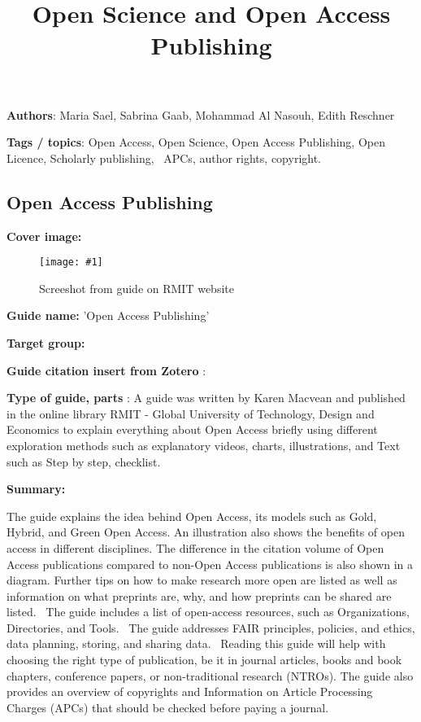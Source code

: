 \documentclass{article}
\newlength{\imgwidth}
\newcommand\scaledgraphics[2]{%
                
\settowidth{\imgwidth}{\texttt{[image: \#1]}}%
                
\setlength{\imgwidth}{\minof{\imgwidth}{#2\textwidth}}%
                
\texttt{[image: \#1]}%
                
}
\begin{document}
\title{Open Science and Open Access Publishing }

\maketitle





\textbf{Authors}:  Maria Sael, Sabrina Gaab, Mohammad Al Nasouh, Edith Reschner


\textbf{Tags / topics}: Open Access, Open Science, Open Access Publishing, Open Licence, Scholarly publishing,  APCs, author rights, copyright.


\subsection{Open Access Publishing}\label{H7151279}



\textbf{Cover image:} 

\begin{figure}
\scaledgraphics{add6dfd7-ef0a-49dc-b0a6-7ae1e4e54339.png}{1}
\caption*{Screeshot from guide on RMIT website}\label{F87257141}
\end{figure}





\textbf{Guide name:} 'Open Access Publishing'


\textbf{Target group:} 


\textbf{Guide citation insert from Zotero} :  \autocite{macvean_all_2021} 


\textbf{Type of guide, parts} : A guide was written by Karen Macvean and published in the online library RMIT - Global University of Technology, Design and Economics to explain everything about Open Access briefly using different exploration methods such as explanatory videos, charts, illustrations, and Text such as Step by step, checklist. 


\textbf{Summary:} 


The guide explains the idea behind Open Access, its models such as Gold, Hybrid, and Green Open Access. An illustration also shows the benefits of open access in different disciplines. The difference in the citation volume of Open Access publications compared to non-Open Access publications is also shown in a diagram. Further tips on how to make research more open are listed as well as information on what preprints are, why, and how preprints can be shared are listed.  The guide includes a list of open-access resources, such as Organizations, Directories, and Tools.  The guide addresses FAIR principles, policies, and ethics, data planning, storing, and sharing data.  Reading this guide will help with choosing the right type of publication, be it in journal articles, books and book chapters, conference papers, or non-traditional research (NTROs). The guide also provides an overview of copyrights and Information on Article Processing Charges (APCs) that should be checked before paying a journal.
\end{document}
